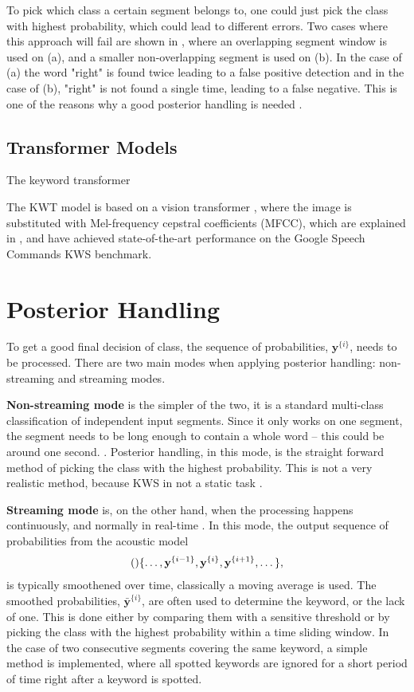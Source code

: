 To pick which class a certain segment belongs to, one could just pick the class with highest probability, which could lead to different errors. Two cases where this approach will fail are shown in , where an overlapping segment window is used on (a), and a smaller non-overlapping segment is used on (b). In the case of (a) the word "right" is found twice leading to a false positive detection and in the case of (b), "right" is not found a single time, leading to a false negative. This is one of the reasons why a good posterior handling is needed \cite{lopez2021deep}.

\subsection{Transformer Models}
The keyword transformer 

The KWT model is based on a vision transformer \cite{dosovitskiy2020image}, where the image is substituted with Mel-frequency cepstral coefficients (MFCC), which are explained in , and have achieved state-of-the-art performance on the Google Speech Commands KWS benchmark.

\section{Posterior Handling}
To get a good final decision of class, the sequence of probabilities, \(\textbf{y}^{\{i\}}\), needs to be processed. There are two main modes when applying posterior handling: non-streaming and streaming modes.

\textbf{Non-streaming mode} is the simpler of the two, it is a standard multi-class classification of independent input segments. Since it only works on one segment, the segment needs to be long enough to contain a whole word – this could be around one second. \cite{lopez2021deep}. Posterior handling, in this mode, is the straight forward method of picking the class with the highest probability. This is not a very realistic method, because KWS in not a static task \cite{lopez2021deep}.

\textbf{Streaming mode} is, on the other hand, when the processing happens continuously, and normally in real-time \cite{lopez2021deep}. In this mode, the output sequence of probabilities from the acoustic model
\begin{align}
    \qty\{ \dots, \textbf{y}^{\{i-1\}}, \textbf{y}^{\{i\}}, \textbf{y}^{\{i+1\}}, \dots\},
\end{align}
is typically smoothened over time, classically a moving average is used. The smoothed probabilities, \(\bar{\textbf{y}}^{\{i\}}\), are often used to determine the keyword, or the lack of one. This is done either by comparing them with a sensitive threshold or by picking the class with the highest probability within a time sliding window. In the case of two consecutive segments covering the same keyword, a simple method is implemented, where all spotted keywords are ignored for a short period of time right after a keyword is spotted.

